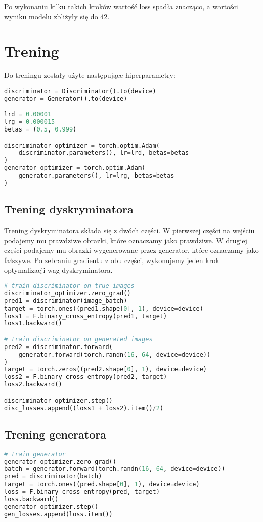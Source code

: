 \documentclass[a4paper]{article}
\begin{document}
Po wykonaniu kilku takich kroków wartość loss spadła znacząco, a wartości wyniku
modelu zbliżyły się do 42.

\section{Trening}
Do treningu zostały użyte następujące hiperparametry:
\begin{lstlisting}[language=python,caption={Parametry treningu}]
discriminator = Discriminator().to(device)
generator = Generator().to(device)

lrd = 0.00001
lrg = 0.000015
betas = (0.5, 0.999)

discriminator_optimizer = torch.optim.Adam(
    discriminator.parameters(), lr=lrd, betas=betas
)
generator_optimizer = torch.optim.Adam(
    generator.parameters(), lr=lrg, betas=betas
)
\end{lstlisting}

\subsection{Trening dyskryminatora}

Trening dyskryminatora składa się z dwóch części. W pierwszej części na wejściu
podajemy mu prawdziwe obrazki, które oznaczamy jako prawdziwe. W drugiej części
podajemy mu obrazki wygenerowane przez generator, które oznaczamy jako fałszywe.
Po zebraniu gradientu z obu części, wykonujemy jeden krok optymalizacji wag dyskryminatora.


\begin{lstlisting}[language=python]
# train discriminator on true images
discriminator_optimizer.zero_grad()
pred1 = discriminator(image_batch)
target = torch.ones((pred1.shape[0], 1), device=device)
loss1 = F.binary_cross_entropy(pred1, target)
loss1.backward()

# train discriminator on generated images
pred2 = discriminator.forward(
    generator.forward(torch.randn(16, 64, device=device))
)
target = torch.zeros((pred2.shape[0], 1), device=device)
loss2 = F.binary_cross_entropy(pred2, target)
loss2.backward()

discriminator_optimizer.step()
disc_losses.append((loss1 + loss2).item()/2)
\end{lstlisting}

\subsection{Trening generatora}

\begin{lstlisting}[language=python]
# train generator
generator_optimizer.zero_grad()
batch = generator.forward(torch.randn(16, 64, device=device))
pred = discriminator(batch)
target = torch.ones((pred.shape[0], 1), device=device)
loss = F.binary_cross_entropy(pred, target)
loss.backward()
generator_optimizer.step()
gen_losses.append(loss.item())
\end{lstlisting}
\end{document}
